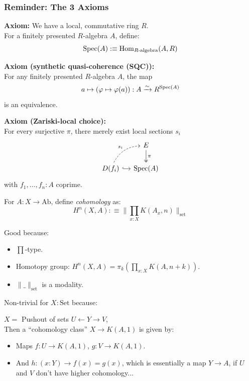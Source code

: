 \documentclass{beamer}
\begin{document}
\begin{frame}
  \frametitle{Reminder: The 3 Axioms}
  \textbf{Axiom:} We have a local, commutative ring $R$. \\

  \vspace{0.25cm}
  For a finitely presented $R$-algebra $A$, define:
  \[ \operatorname{Spec}(A):\equiv \mathrm{Hom}_{R\text{-algebra}}(A,R)\]

  \textbf{Axiom (synthetic quasi-coherence (SQC)):} \\
  For any finitely presented $R$-algebra $A$, the map
  \[ a\mapsto (\varphi\mapsto \varphi(a)):A \xrightarrow{\sim} R^{\operatorname{Spec}(A)} \]
  is an equivalence.

  \textbf{Axiom (Zariski-local choice):}\\
  For every surjective $\pi$, there merely exist local sections $s_i$
  \[ \begin{tikzcd}[ampersand replacement=\&, column sep=small]
    \& E \ar[d, two heads, "\pi"] \\
    D(f_i) \ar[r, hook] \ar[ur, bend left, dashed, "s_i"] \& \Spec(A)
  \end{tikzcd} \]
  with $f_1, \dots, f_n : A$ coprime.
\end{frame}

\begin{frame}
  \vspace{0.25cm}
  For $A : X \to \mathrm{Ab}$, define \emph{cohomology} as:
  \[ H^n(X, A) :\equiv \Big\| \prod_{x:X}K(A_x,n) \Big\|_{\mathrm{set}} \]
  
  \pause
  Good because:
  \begin{itemize}
  \item $\prod$-type.
  \item Homotopy group: $H^n(X,A)=\pi_{k}(\prod_{x:X}K(A,n+k))$.
  \item $\|\_\|_{\mathrm{set}}$ is a modality.
  \end{itemize}

  \pause
  Non-trivial for $X:\mathrm{Set}$ because:

  $X=$ Pushout of sets $U\leftarrow Y\to V$, \\
  Then a ``cohomology class'' $X\to K(A,1)$ is given by:
  \begin{itemize}
  \item Maps $f:U\to K(A,1)$, $g:V\to K(A,1)$.
  \item And $h:(x:Y)\to f(x)=g(x)$, which is essentially a map $Y\to A$,
    if $U$ and $V$ don't have higher cohomology...
  \end{itemize}
\end{frame}
\end{document}

